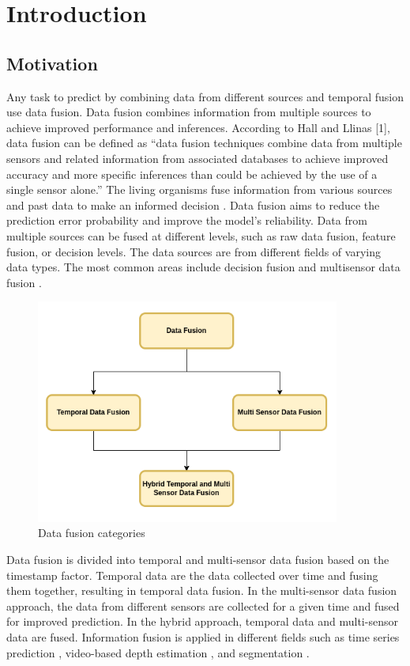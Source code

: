 
    \chapter{Introduction}
	\label{chap:introduction}
	
	\section{Motivation}
		
	Any task to predict by combining data from different sources and temporal fusion use data fusion. Data fusion combines information from multiple sources to achieve improved performance and inferences. According to Hall and Llinas [1], data fusion can be defined as “data fusion techniques combine data from multiple sensors and related information from associated databases to achieve improved accuracy and more specific inferences than could be achieved by the use of a single sensor alone.” The living organisms fuse information from various sources and past data to make an informed decision \cite{01_mandic2005data}.  
	Data fusion aims to reduce the prediction error probability and improve the model's reliability. Data from multiple sources can be fused at different levels, such as raw data fusion, feature fusion, or decision levels. The data sources are from different fields of varying data types. The most common areas include decision fusion and multisensor data fusion \cite{06_castanedo2013review}. 
	
	\begin{figure}[h]
		\centering
		\includegraphics[width=10cm]{images/df.png}
		\caption{Data fusion categories}
		\label{fig:3D_reconstruction}
	\end{figure}

	Data fusion is divided into temporal and multi-sensor data fusion based on the timestamp factor. Temporal data are the data collected over time and fusing them together, resulting in temporal data fusion. In the multi-sensor data fusion approach, the data from different sensors are collected for a given time and fused for improved prediction. In the hybrid approach, temporal data and multi-sensor data are fused. Information fusion is applied in different fields such as time series prediction \cite{02_lim2021temporal}, video-based depth estimation \cite{03_duzceker2021deepvideomvs}, and segmentation \cite{04_li2021spatial}.
	

